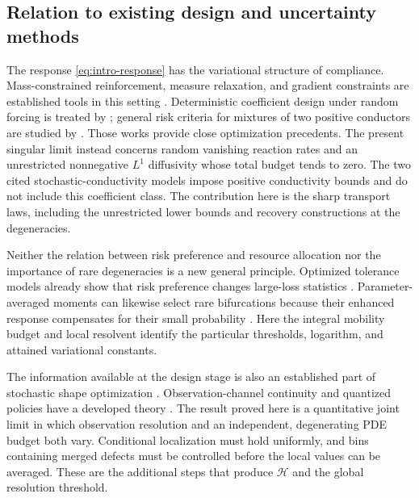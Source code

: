 \subsection{Relation to existing design and uncertainty methods}
The response \eqref{eq:intro-response} has the variational structure
of compliance. Mass-constrained reinforcement, measure relaxation,
and gradient constraints are established tools in this setting
\citep{BouchitteButtazzo2001,ButtazzoOudetVelichkov2015}.
Deterministic coefficient design under random forcing is treated by
\citet{ButtazzoMaestre2011}; general risk criteria for mixtures of
two positive conductors are studied by
\citet{AlphonseKunstekVrdoljak2026}. Those works provide close
optimization precedents. The present singular limit instead concerns
random vanishing reaction rates and an unrestricted nonnegative
$L^1$ diffusivity whose total budget tends to zero. The two cited
stochastic-conductivity models impose positive conductivity bounds
and do not include this coefficient class.
The contribution here is the sharp transport laws, including the
unrestricted lower bounds and recovery constructions at the degeneracies.

Neither the relation between risk preference and resource allocation
nor the importance of rare degeneracies is a new general principle.
Optimized tolerance models already show that risk preference changes
large-loss statistics \citep{NewmanGirvanFarmer2002}. Parameter-averaged
moments can likewise select rare bifurcations because their enhanced
response compensates for their small probability
\citep{BerryKeatingSchomerus2000}. Here the integral mobility budget
and local resolvent identify the particular thresholds, logarithm,
and attained variational constants.

The information available at the design stage is also an established
part of stochastic shape optimization \citep{ContiEtAl2009}.
Observation-channel continuity and quantized policies have a developed
theory \citep{YukselLinder2012,SaldiYukselLinder2017}.
The result proved here is a quantitative joint limit in which
observation resolution and an independent, degenerating PDE budget
both vary. Conditional localization must hold uniformly, and bins
containing merged defects must be controlled before the local values
can be averaged. These are the additional steps that produce
$\mathcal H$ and the global resolution threshold.

